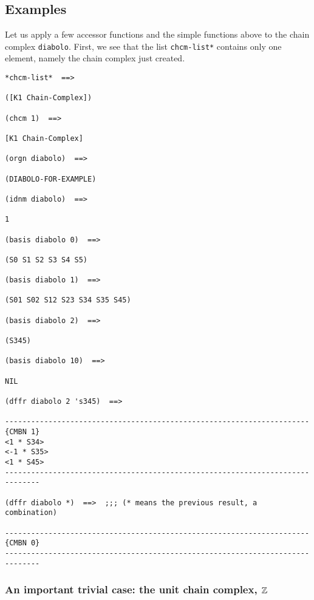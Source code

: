 \subsection* {Examples}

Let us apply a few accessor functions and the simple  functions above to the chain complex {\tt diabolo}.
First, we see that the list {\tt *chcm-list*} contains only one element, namely the chain complex
just created.
{\footnotesize\begin{verbatim}
*chcm-list*  ==>

([K1 Chain-Complex])

(chcm 1)  ==>

[K1 Chain-Complex]

(orgn diabolo)  ==>

(DIABOLO-FOR-EXAMPLE)

(idnm diabolo)  ==>

1

(basis diabolo 0)  ==>

(S0 S1 S2 S3 S4 S5)

(basis diabolo 1)  ==>

(S01 S02 S12 S23 S34 S35 S45)

(basis diabolo 2)  ==>

(S345)

(basis diabolo 10)  ==>

NIL

(dffr diabolo 2 's345)  ==>

----------------------------------------------------------------------{CMBN 1}
<1 * S34>
<-1 * S35>
<1 * S45>
------------------------------------------------------------------------------

(dffr diabolo *)  ==>  ;;; (* means the previous result, a combination)

----------------------------------------------------------------------{CMBN 0}
------------------------------------------------------------------------------
\end{verbatim}}
\newpage

\subsubsection{An important trivial case: the unit chain complex, ${\mathbb{Z}}$}

